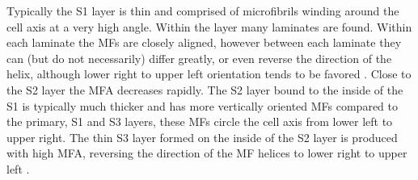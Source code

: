 Typically the S1 layer is thin and comprised of microfibrils winding around the
cell axis at a very high angle. Within the layer many laminates are found.
Within each laminate the MFs are closely aligned, however between each laminate
they can (but do not necessarily) differ greatly, or even reverse the direction
of the helix, although lower right to upper left
orientation tends to be favored \citep{fromm2013cellular}. Close to the S2 layer the MFA decreases
rapidly. The S2 layer bound to the inside of the S1 is typically much thicker and
has more vertically oriented MFs compared to the primary, S1 and S3
layers, these MFs circle the cell axis from lower left to upper right. The thin S3 layer formed on the inside of the S2 layer is produced with
high MFA, reversing the direction of the MF helices to lower right to upper
left \citep{walker1993primary}.